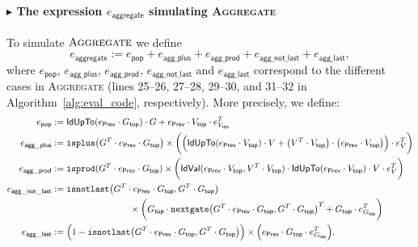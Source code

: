 \paragraph{$\blacktriangleright$ The expression $e_{\mathsf{aggregate}}$ simulating {\normalfont\textsc{Aggregate}}}
To simulate $\textsc{Aggregate}$ we define
$$
	e_{\mathsf{aggregate}}:=e_{\mathsf{pop}}+e_{\mathsf{agg\_plus}}+e_{\mathsf{agg\_prod}}+e_{\mathsf{agg\_not\_last}}+e_{\mathsf{agg\_last}},
	$$
where  $e_{\mathsf{pop}}$, $e_{\mathsf{agg\_plus}}$, $e_{\mathsf{agg\_prod}}$, $e_{\mathsf{agg\_not\_last}}$ and $e_{\mathsf{agg\_last}}$ correspond to the different cases in \textsc{Aggregate} (lines 25--26, 27--28, 29--30, and 31--32 in Algorithm~\ref{alg:eval_code}, respectively). More precisely, we define:
%
    \begin{align*}\allowdisplaybreaks
        e_{\mathsf{pop}} &:= \Iden{e_{\mathsf{Prev}}\cdot G_{\mathsf{top}}}\cdot G + e_{\mathsf{Prev}}\cdot V_{\mathsf{top}}\cdot e_{V_{\mathsf{top}}}^T  \\
        e_{\mathsf{agg\_plus}}&:= \texttt{isplus}\bigl(G^T \cdot e_{\mathsf{Prev}} \cdot G_{\mathsf{top}}\bigr) \times \biggl(\Bigl(\Iden{e_{\mathsf{Prev}}\cdot V_{\mathsf{top}}} \cdot V + \bigl( V^T \cdot V_{\mathsf{top}} \bigr)\cdot \bigl(e_{\mathsf{Prev}}\cdot V_{\mathsf{top}}\bigr)\Bigr) \cdot e_{V}^T \biggr) \\
        e_{\mathsf{agg\_prod}}&:= \isprod{G^T \cdot e_{\mathsf{Prev}} \cdot G_{\mathsf{top}}} \times \biggl(
				 \pondIden{e_{\mathsf{Prev}}\cdot V_{\mathsf{top}}}{V^T \cdot V_{\mathsf{top}}}\cdot 
				 \Iden{e_{\mathsf{Prev}}\cdot V_{\mathsf{top}}} \cdot V \cdot e_{V}^T \biggr) \\
e_{\mathsf{agg\_not\_last}} &:= \texttt{isnotlast}\bigl(G^T \cdot e_{\mathsf{Prev}} \cdot G_{\mathsf{top}},G^T \cdot G_{\mathsf{top}}\bigr) \\
&\hspace{3cm}\times \biggl(G_{\mathsf{top}} \cdot \texttt{nextgate}\bigl(G^T \cdot e_{\mathsf{Prev}}\cdot G_{\mathsf{top}},G^T \cdot G_{\mathsf{top}}\bigr)^T + G_{\mathsf{top}}\cdot e_{G_{\mathsf{top}}}^T \biggr) \\
 e_{\mathsf{agg\_last}}&:= \Bigl( 1 - \texttt{isnotlast}\bigl(G^T \cdot e_{\mathsf{Prev}}\cdot G_{\mathsf{top}},G^T \cdot G_{\mathsf{top}}\bigr)\Bigr)\times \Bigl(e_{\mathsf{Prev}}\cdot G_{\mathsf{top}} \cdot e_{G_{\mathsf{top}}}^T \Bigr).
    \end{align*}
